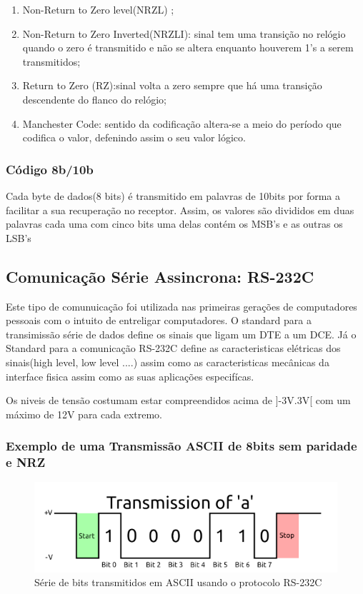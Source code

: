 \documentclass[10pt,a4paper]{paper}
\begin{document}
	\begin{enumerate}
		\item Non-Return to Zero level(NRZL) ;
		\item Non-Return to Zero Inverted(NRZLI): sinal tem uma transição no relógio quando o zero é transmitido e não se altera enquanto houverem 1's a serem transmitidos;
		\item Return to Zero (RZ):sinal volta a zero sempre que há uma transição descendente do flanco do relógio;
		\item Manchester Code: sentido da codificação altera-se a meio do período que codifica o valor, defenindo assim o seu valor lógico.
	\end{enumerate}
	
	\subsubsection*{Código 8b/10b}
	Cada byte de dados(8 bits) é transmitido em palavras de 10bits por forma a facilitar a sua recuperação no receptor. Assim, os valores são divididos em duas palavras cada uma com cinco bits uma delas contém os MSB's e as outras os LSB's 
	 
	
 \subsection*{ Comunicação Série Assincrona: RS-232C}
 
 Este tipo de comunuicação foi utilizada nas primeiras gerações de computadores pessoais com o intuito de entreligar computadores.
 O standard para a transimissão série de dados define  os sinais que ligam um DTE a um DCE.
 Já o Standard para a comunicação RS-232C define as caracteristicas elétricas  dos sinais(high level, low level ....)
 assim como as caracteristicas mecânicas da interface fisica assim como as suas aplicações especifícas.
 
 Os niveis de tensão costumam estar compreendidos acima de ]-3V.3V[ com um máximo de 12V para cada extremo.
 \newpage
 
 \subsubsection*{Exemplo de uma Transmissão ASCII de 8bits sem paridade e NRZ}
 
 	\begin{figure}[ht]
		\includegraphics[scale=0.5]{fig8.png}
		\centering
		\caption{Série de bits transmitidos em ASCII usando o protocolo RS-232C}
		\label{fig:figura8 }
	\end{figure}
	
\end{document}
